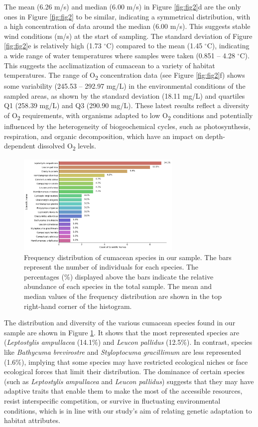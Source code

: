 The mean (6.26 m/s) and median (6.00 m/s) in Figure \ref{fig:fig2}d are the only ones in Figure \ref{fig:fig2} to be similar, indicating a symmetrical distribution, with a high concentration of data around the median (6.00 m/s). This suggests stable wind conditions (m/s) at the start of sampling. The standard deviation of Figure \ref{fig:fig2}e is relatively high (1.73 $^\circ$C) compared to the mean (1.45 $^\circ$C), indicating a wide range of water temperatures where samples were taken (0.851 – 4.28 $^\circ$C). This suggests the acclimatization of cumacean to a variety of habitat temperatures. The range of O\textsubscript{2} concentration data (see Figure \ref{fig:fig2}f) shows some variability (245.53 – 292.97 mg/L) in the environmental conditions of the sampled areas, as shown by the standard deviation (18.11 mg/L) and quartiles Q1 (258.39 mg/L) and Q3 (290.90 mg/L). These latest results reflect a diversity of O\textsubscript{2} requirements, with organisms adapted to low O\textsubscript{2} conditions and potentially influenced by the heterogeneity of biogeochemical cycles, such as photosynthesis, respiration, and organic decomposition, which have an impact on depth-dependent dissolved  O\textsubscript{2} levels.

\begin{figure}[htbp]
    \centering
    \includegraphics[width=0.7\textwidth]{figure2.jpg}
    \caption{Frequency distribution of cumacean species in our sample. The bars represent the number of individuals for each species. The percentages (\%) displayed above the bars indicate the relative abundance of each species in the total sample. The mean and median values of the frequency distribution are shown in the top right-hand corner of the histogram. \label{fig:fig3}}
\end{figure}

The distribution and diversity of the various cumacean species found in our sample are shown in Figure \ref{fig:fig3}. It shows that the most represented species are (\emph{Leptostylis ampullacea} (14.1\%) and \emph{Leucon pallidus} (12.5\%). In contrast, species like \emph{Bathycuma brevirostre} and \emph{Styloptocuma gracillimum} are less represented (1.6\%), implying that some species may have restricted ecological niches or face ecological forces that limit their distribution. The dominance of certain species (such as \emph{Leptostylis ampullacea} and \emph{Leucon pallidus}) suggests that they may have adaptive traits that enable them to make the most of the accessible resources, resist interspecific competition, or survive in fluctuating environmental conditions, which is in line with our study's aim of relating genetic adaptation to habitat attributes. 

